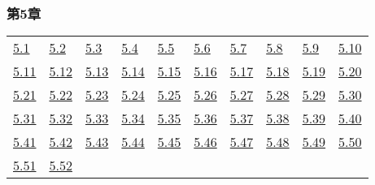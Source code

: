 \subsubsection*{第5章} 

\begin{tabular}{llllllllll}
\hyperref[練習問題 5.1]{5.1} &
\hyperref[練習問題 5.2]{5.2} &
\hyperref[練習問題 5.3]{5.3} &
\hyperref[練習問題 5.4]{5.4} &
\hyperref[練習問題 5.5]{5.5} &
\hyperref[練習問題 5.6]{5.6} &
\hyperref[練習問題 5.7]{5.7} &
\hyperref[練習問題 5.8]{5.8} &
\hyperref[練習問題 5.9]{5.9} &
\hyperref[練習問題 5.10]{5.10}
\\ 
\hyperref[練習問題 5.11]{5.11} &
\hyperref[練習問題 5.12]{5.12} &
\hyperref[練習問題 5.13]{5.13} &
\hyperref[練習問題 5.14]{5.14} &
\hyperref[練習問題 5.15]{5.15} &
\hyperref[練習問題 5.16]{5.16} &
\hyperref[練習問題 5.17]{5.17} &
\hyperref[練習問題 5.18]{5.18} &
\hyperref[練習問題 5.19]{5.19} &
\hyperref[練習問題 5.20]{5.20}
\\ 
\hyperref[練習問題 5.21]{5.21} &
\hyperref[練習問題 5.22]{5.22} &
\hyperref[練習問題 5.23]{5.23} &
\hyperref[練習問題 5.24]{5.24} &
\hyperref[練習問題 5.25]{5.25} &
\hyperref[練習問題 5.26]{5.26} &
\hyperref[練習問題 5.27]{5.27} &
\hyperref[練習問題 5.28]{5.28} &
\hyperref[練習問題 5.29]{5.29} &
\hyperref[練習問題 5.30]{5.30}
\\ 
\hyperref[練習問題 5.31]{5.31} &
\hyperref[練習問題 5.32]{5.32} &
\hyperref[練習問題 5.33]{5.33} &
\hyperref[練習問題 5.34]{5.34} &
\hyperref[練習問題 5.35]{5.35} &
\hyperref[練習問題 5.36]{5.36} &
\hyperref[練習問題 5.37]{5.37} &
\hyperref[練習問題 5.38]{5.38} &
\hyperref[練習問題 5.39]{5.39} &
\hyperref[練習問題 5.40]{5.40}
\\ 
\hyperref[練習問題 5.41]{5.41} &
\hyperref[練習問題 5.42]{5.42} &
\hyperref[練習問題 5.43]{5.43} &
\hyperref[練習問題 5.44]{5.44} &
\hyperref[練習問題 5.45]{5.45} &
\hyperref[練習問題 5.46]{5.46} &
\hyperref[練習問題 5.47]{5.47} &
\hyperref[練習問題 5.48]{5.48} &
\hyperref[練習問題 5.49]{5.49} &
\hyperref[練習問題 5.50]{5.50}
\\ 
\hyperref[練習問題 5.51]{5.51} &
\hyperref[練習問題 5.52]{5.52} &
\end{tabular} 

